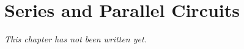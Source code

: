 \chapter{Series and Parallel Circuits}\label{ch:g5:series-parallel-circuits}


\emph{This chapter has not been written yet.}
